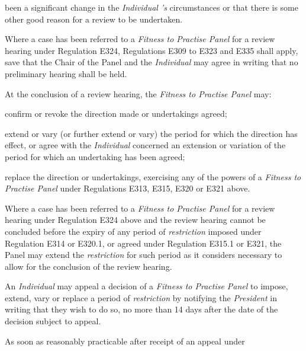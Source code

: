 been a significant change in the \emph{Individual 's} circumstances or
that there is some other good reason for a review to be undertaken.\\
\par
Where a case has been referred to a \emph{Fitness to Practise Panel} for
a review hearing under Regulation E324, Regulations E309 to E323 and
E335 shall apply, save that the Chair of the Panel and
the \emph{Individual} may agree in writing that no preliminary hearing
shall be held.\\
\hspace*{0.333em}\par
{}\par
At the conclusion of a review hearing, the \emph{Fitness to Practise
Panel} may:\\\nl \item confirm or revoke the direction made or undertakings agreed;\item extend or vary (or further extend or vary) the period for which the
direction has effect, or agree with the \emph{Individual} concerned an
extension or variation of the period for which an undertaking has been
agreed;\item replace the direction or undertakings, exercising any of the powers
of a \emph{Fitness to Practise Panel} under Regulations E313, E315, E320
or E321 above.\ln
{}\par
Where a case has been referred to a \emph{Fitness to Practise Panel} for
a review hearing under Regulation E324 above and the review hearing
cannot be concluded before the expiry of any period
of \emph{restriction} imposed under Regulation E314 or E320.1, or agreed
under Regulation E315.1 or E321, the Panel may extend
the \emph{restriction} for such period as it considers necessary to
allow for the conclusion of the review hearing.\\
\par
{}
An \emph{Individual} may appeal a decision of a \emph{Fitness to
Practise Panel} to impose, extend, vary or replace a period
of \emph{restriction} by notifying the \emph{President} in writing that
they wish to do so, no more than 14 days after the date of the decision
subject to appeal.\\
\par
As soon as reasonably practicable after receipt of an appeal under

